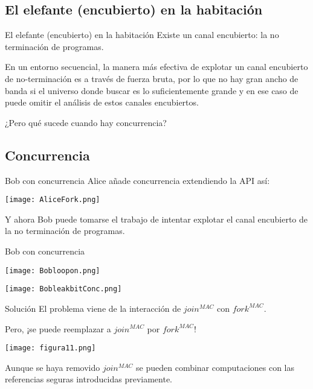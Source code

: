 \documentclass{beamer}
\begin{document}
\subsection{El elefante (encubierto) en la habitación}
\begin{frame}{El elefante (encubierto) en la habitación}
\pause
    Existe un canal encubierto: la no terminación de programas.

    \vspace{0.5cm}
    \pause[3]
    En un entorno secuencial, la manera más efectiva de explotar un canal encubierto de no-terminación es a través de fuerza bruta, por lo que no hay gran ancho de banda si el universo donde buscar es lo suficientemente grande y en ese caso de puede omitir el análisis de estos canales encubiertos.

    \vspace{0.5cm}
    \pause[4]
    ¿Pero qué sucede cuando hay concurrencia?
\end{frame}

\subsection{Concurrencia}

\begin{frame}{Bob con concurrencia}
    \pause
    Alice añade concurrencia extendiendo la API así:

    \pause[3]
    \begin{center}
        \texttt{[image: AliceFork.png]}
    \end{center}

    Y ahora Bob puede tomarse el trabajo de intentar explotar el canal encubierto de la no terminación de programas.
\end{frame}

\begin{frame}{Bob con concurrencia}
    \pause
    \begin{center}
        \texttt{[image: Bobloopon.png]}
    \end{center}

    \begin{center}
        \texttt{[image: BobleakbitConc.png]}
    \end{center}
\end{frame}

\begin{frame}{Solución}
    \pause
    El problema viene de la interacción de $join^{MAC}$ con $fork^{MAC}$.

    \pause[3]
    Pero, ¡se puede reemplazar a $join^{MAC}$ por $fork^{MAC}$!

    \begin{center}
        \texttt{[image: figura11.png]}
    \end{center}

    Aunque se haya removido $join^{MAC}$ se pueden combinar computaciones con las referencias seguras introducidas previamente.
\end{frame}
\end{document}
